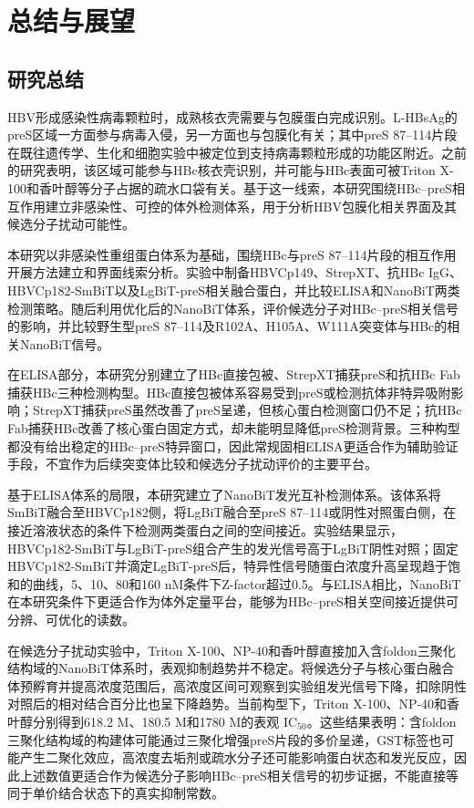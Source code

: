 \chapter{总结与展望}

\section{研究总结}

HBV形成感染性病毒颗粒时，成熟核衣壳需要与包膜蛋白完成识别。L-HBsAg的preS区域一方面参与病毒入侵，另一方面也与包膜化有关；其中preS 87--114片段在既往遗传学、生化和细胞实验中被定位到支持病毒颗粒形成的功能区附近。之前的研究表明，该区域可能参与HBc核衣壳识别，并可能与HBc表面可被Triton X-100和香叶醇等分子占据的疏水口袋有关。基于这一线索，本研究围绕HBc--preS相互作用建立非感染性、可控的体外检测体系，用于分析HBV包膜化相关界面及其候选分子扰动可能性。

本研究以非感染性重组蛋白体系为基础，围绕HBc与preS 87--114片段的相互作用开展方法建立和界面线索分析。实验中制备HBVCp149、StrepXT、抗HBc IgG、HBVCp182-SmBiT以及LgBiT-preS相关融合蛋白，并比较ELISA和NanoBiT两类检测策略。随后利用优化后的NanoBiT体系，评价候选分子对HBc--preS相关信号的影响，并比较野生型preS 87--114及R102A、H105A、W111A突变体与HBc的相关NanoBiT信号。

在ELISA部分，本研究分别建立了HBc直接包被、StrepXT捕获preS和抗HBc Fab捕获HBc三种检测构型。HBc直接包被体系容易受到preS或检测抗体非特异吸附影响；StrepXT捕获preS虽然改善了preS呈递，但核心蛋白检测窗口仍不足；抗HBc Fab捕获HBc改善了核心蛋白固定方式，却未能明显降低preS检测背景。三种构型都没有给出稳定的HBc--preS特异窗口，因此常规固相ELISA更适合作为辅助验证手段，不宜作为后续突变体比较和候选分子扰动评价的主要平台。

基于ELISA体系的局限，本研究建立了NanoBiT发光互补检测体系。该体系将SmBiT融合至HBVCp182侧，将LgBiT融合至preS 87--114或阴性对照蛋白侧，在接近溶液状态的条件下检测两类蛋白之间的空间接近。实验结果显示，HBVCp182-SmBiT与LgBiT-preS组合产生的发光信号高于LgBiT阴性对照；固定HBVCp182-SmBiT并滴定LgBiT-preS后，特异性信号随蛋白浓度升高呈现趋于饱和的曲线，5、10、80和160 nM条件下Z-factor超过0.5。与ELISA相比，NanoBiT在本研究条件下更适合作为体外定量平台，能够为HBc--preS相关空间接近提供可分辨、可优化的读数。

在候选分子扰动实验中，Triton X-100、NP-40和香叶醇直接加入含foldon三聚化结构域的NanoBiT体系时，表观抑制趋势并不稳定。将候选分子与核心蛋白融合体预孵育并提高浓度范围后，高浓度区间可观察到实验组发光信号下降，扣除阴性对照后的相对结合百分比也呈下降趋势。当前构型下，Triton X-100、NP-40和香叶醇分别得到618.2 \textmu M、180.5 \textmu M和1780 \textmu M的表观 IC$_{50}$。这些结果表明：含foldon三聚化结构域的构建体可能通过三聚化增强preS片段的多价呈递，GST标签也可能产生二聚化效应，高浓度去垢剂或疏水分子还可能影响蛋白状态和发光反应，因此上述数值更适合作为候选分子影响HBc--preS相关信号的初步证据，不能直接等同于单价结合状态下的真实抑制常数。

